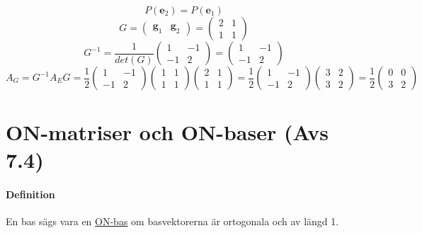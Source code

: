 \begin{equation*}
    P(\bm{e}_2)=P(\bm{e}_1)
\end{equation*}
\begin{equation*}
    G=\begin{pmatrix}\bm{g}_1 & \bm{g}_2\end{pmatrix}=\begin{pmatrix}2&1\\1&1\end{pmatrix}
\end{equation*}
\begin{equation*}
    G^{-1}=\frac{1}{det(G)}\begin{pmatrix}1&-1\\-1&2\end{pmatrix}=\begin{pmatrix}1&-1\\-1&2\end{pmatrix}
\end{equation*}
\begin{equation*}
    A_G=G^{-1}A_EG=
    \frac{1}{2}\begin{pmatrix}1&-1\\-1&2\end{pmatrix}\begin{pmatrix}1&1\\1&1\end{pmatrix}\begin{pmatrix}2&1\\1&1\end{pmatrix}=
    \frac{1}{2}\begin{pmatrix}1&-1\\-1&2\end{pmatrix}\begin{pmatrix}3&2\\3&2\end{pmatrix}=
    \frac{1}{2}\begin{pmatrix}0&0\\3&2\end{pmatrix}
\end{equation*}

\section{ON-matriser och ON-baser (Avs 7.4)}
\paragraph{Definition} En bas sägs vara en \underline{ON-bas} om basvektorerna är ortogonala och av längd 1.

